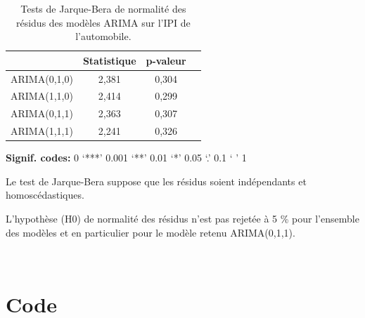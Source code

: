\documentclass[french]{article}
\begin{document}
\begin{table}[!h]

\caption{\label{tab:tabjb}Tests de Jarque-Bera de normalité des résidus des modèles ARIMA sur l'IPI de l'automobile.}
\centering
\begin{threeparttable}
\begin{tabular}[t]{lccc}
\toprule
  & Statistique & p-valeur & \\
\midrule
ARIMA(0,1,0) & 2,381 & 0,304 & \\
ARIMA(1,1,0) & 2,414 & 0,299 & \\
ARIMA(0,1,1) & 2,363 & 0,307 & \\
ARIMA(1,1,1) & 2,241 & 0,326 & \\
\bottomrule
\end{tabular}
\begin{tablenotes}
\item \hspace{-0.4cm}\textbf{Signif. codes: }0 `***' 0.001 `**' 0.01 `*' 0.05 `.' 0.1 ` ' 1
\item Le test de Jarque-Bera suppose que les résidus soient indépendants et homoscédastiques.
\item L’hypothèse (H0) de normalité des résidus n’est pas rejetée à 5 \% pour l’ensemble des modèles et en particulier pour le modèle retenu ARIMA(0,1,1).
\end{tablenotes}
\end{threeparttable}
\end{table}

\newpage

~
\newpage

\hypertarget{code}{%
\section{\texorpdfstring{Code \faRProject{}}{Code }}\label{code}}
\end{document}
